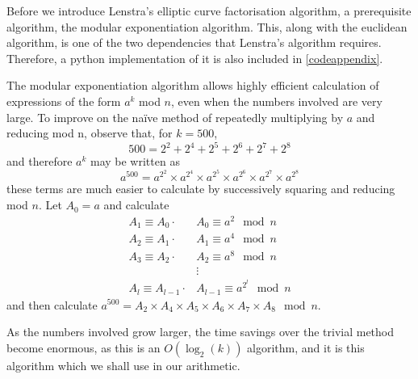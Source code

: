 Before we introduce Lenstra's elliptic curve factorisation algorithm, a prerequisite algorithm, the modular exponentiation algorithm.
This, along with the euclidean algorithm, is one of the two dependencies that Lenstra's algorithm requires.
Therefore, a python implementation of it is also included in \cref{codeappendix}.
\begin{definition}
	The modular exponentiation algorithm allows highly efficient calculation of expressions of the form $a^k$ mod $n$, even when the numbers involved are very large.
	To improve on the naïve method of repeatedly multiplying by $a$ and reducing mod n, observe that, for $k=500$,
$$500=2^2+2^4+2^5+2^6+2^7+2^8$$
and therefore $a^k$ may be written as
$$a^{500} = a^{2^{2}} \times a^{2^{4}} \times a^{2^{5}} \times a^{2^{6}} \times a^{2^{7}} \times a^{2^{8}}$$
these terms are much easier to calculate by successively squaring and reducing mod $n$.
Let $A_0 = a$ and calculate
\begin{align*}
	A_1\equiv A_0\cdot &A_0 \equiv a^2 \mod n\\
	A_2\equiv A_1\cdot &A_1 \equiv a^4 \mod n\\
	A_3\equiv A_2\cdot &A_2 \equiv a^8 \mod n\\
	&\vdots\\
	A_l\equiv A_{l-1}\cdot &A_{l-1} \equiv a^{2^{l}} \mod n
\end{align*}
and then calculate $a^{500} = A_2 \times A_4 \times A_5 \times A_6 \times A_7 \times A_8 \mod n$.
\end{definition}
As the numbers involved grow larger, the time savings over the trivial method become enormous, as this is an $O(\log_2(k))$ algorithm, and it is this algorithm which we shall use in our arithmetic.


